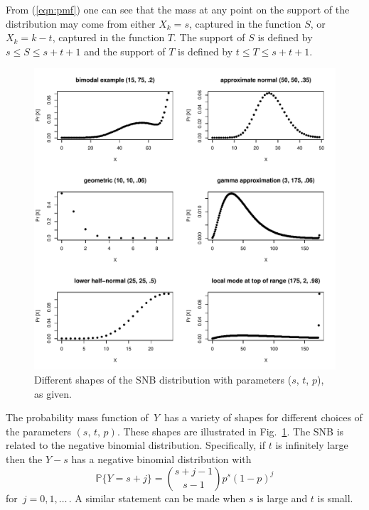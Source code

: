 \documentclass[12pt]{article}         %
\begin{document}
From (\ref{eqn:pmf}) one can see that the mass at any point on the support of the distribution may come from either $X_k = s$, captured in the function $S$, or $X_k = k-t$, captured in the function $T$. The support of $S$ is defined by $s \leq S \leq s+t+1$ and the support of $T$ is defined by $t \leq T \leq s+t+1$.

\begin{figure}[p!]
\begin{center}
\includegraphics[scale=.9]{shapes.pdf}
\end{center}
\caption{Different shapes of the SNB distribution with parameters ($s$, $t$, $p$), as given. \label{shapes.fig}}
\end{figure}

The probability mass function of $\,Y\,$ has a variety of shapes for different choices of the parameters $(s,\, t,\,p)$.
These shapes are illustrated in Fig.~\ref{shapes.fig}.
The SNB is related to the negative binomial distribution. Specifically, if 
$t$ is infinitely large then the $Y-s$ has a negative binomial distribution 
with
\begin{equation*}                                    %
   \mathbb{P}\{Y=s+j \}        \label{nb1.eq}
          = {{s+j-1}\choose{s-1}} p^s (1-p)^j
\end{equation*}
for $\,j=0, 1,\ldots\,$. A similar statement can be made when $s$ is large
and $t$ is small.
\end{document}
